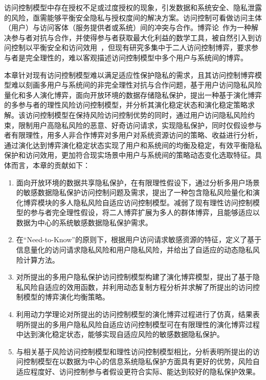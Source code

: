 访问控制模型中存在授权不足或过度授权的现象，引发数据和系统安全、隐私泄露的风险，亟需能够平衡安全隐私与授权度间的解决方案。访问控制可看做访问主体（用户）与访问客体（服务提供者或系统）间的冲突与合作。博弈论~\cite{owen2001game}作为一种解决参与者对抗与合作，并使得参与者获取最大化利益的数学工具，被自然引入到访问控制以平衡安全和访问效用~\cite{helil2017non,gao2018game,wang2019game}，但现有研究多集中于二人访问控制博弈，要求参与者是完全理性的，难以客观描述访问控制模型中多个用户与系统间的博弈。

本章针对现有访问控制模型难以满足适应性保护隐私的需求，且其访问控制博弈模型难以刻画多用户与系统间的非完全理性对抗与合作问题，基于用户访问隐私风险量化和多人演化博弈，面向开放环境的数据存储隐私保护，提出一种基于演化博弈的多参与者的理性风险访问控制模型，并分析其演化稳定状态和演化稳定策略求解。该访问控制模型在保持风险访问控制优势的同时，通过用户访问隐私风险约束，限制用户高隐私风险的恶意、好奇访问请求，实现隐私保护，同时仅假设参与者有限理性，用多人非合作博弈对多用户对系统资源访问的策略、收益进行分析，通过演化达到博弈演化稳定状态实现了用户和系统间的均衡及稳定，有效平衡隐私保护和访问效用，更加符合现实场景中用户与系统间的策略动态变化选取特征。具体而言，本章的贡献如下：
\begin{enumerate}
	\item 面向开放环境的数据共享隐私保护，在有限理性假设下，通过分析多用户场景的敏感数据隐私保护访问控制问题及需求，提出了一种包含隐私风险量化和演化博弈模块的多人隐私风险自适应访问控制模型。减弱了现有理性访问控制模型的参与者完全理性假设，将二人博弈扩展为多人的群体博弈，且能够适应以数据为中心的系统敏感数据隐私保护需求。
	\item 在“Need-to-Know”的原则下，根据用户访问请求敏感资源的特征，定义了基于信息量化的访问请求隐私风险和用户隐私风险，并给出了自适应的动态隐私风险计算方法。
	\item 对所提出的多用户隐私保护访问控制模型构建了演化博弈模型，提出了基于隐私风险自适应的效用函数，并利用动态复制方程分析并求解了所提出的访问控制模型的博弈演化均衡策略。
	\item 利用动力学理论对所提出的访问控制模型的演化博弈过程进行了仿真，结果表明所提出的多用户隐私风险自适应访问控制模型可在有限理性的演化博弈过程中达到演化稳定状态，能够实现自适应风险的敏感数据隐私保护。
	\item 与相关基于风险访问控制模型和理性访问控制模型相比，分析表明所提出的访问控制模型在以数据为中心的信息系统隐私保护方面具有更好的优势，风险自适应程度好、访问控制参与者假设更符合实际、能达到较好的隐私保护效果。
\end{enumerate}



